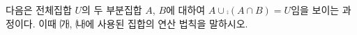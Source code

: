 다음은 전체집합 $U$의 두 부분집합 $A$, $B$에 대하여 $A\cup\comp{(A\cap B)}=U$임을 보이는 과정이다. 이때 ㈎, ㈏에 사용된 집합의 연산 법칙을 말하시오.

